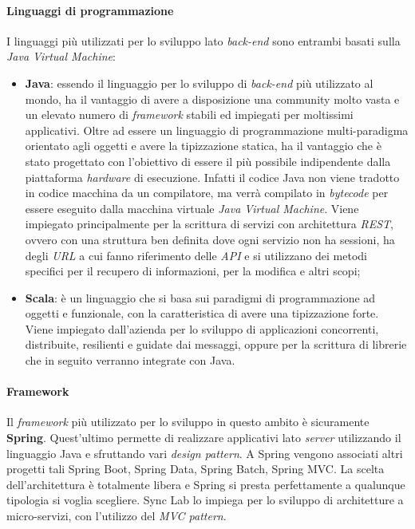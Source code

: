 \paragraph{Linguaggi di programmazione}
I linguaggi più utilizzati per lo sviluppo lato \textit{back-end} sono entrambi basati sulla \textit{Java Virtual Machine}:
\begin{itemize}
  \item \textbf{Java}: essendo il linguaggio per lo sviluppo di \textit{back-end} più utilizzato al mondo, ha il vantaggio di avere a disposizione una community molto vasta e un elevato numero di \textit{framework} stabili ed impiegati per moltissimi applicativi. Oltre ad essere un linguaggio di programmazione multi-paradigma orientato agli oggetti e avere la tipizzazione statica, ha il vantaggio che è stato progettato con l'obiettivo di essere il più possibile indipendente dalla piattaforma \textit{hardware} di esecuzione. Infatti il codice Java non viene tradotto in codice macchina da un compilatore, ma verrà compilato in \textit{bytecode} per essere eseguito dalla macchina virtuale \textit{Java Virtual Machine}. Viene impiegato principalmente per la scrittura di servizi con architettura \textit{REST}, ovvero con una struttura ben definita dove ogni servizio non ha sessioni, ha degli \textit{URL} a cui fanno riferimento delle \textit{API} e si utilizzano dei metodi specifici per il recupero di informazioni, per la modifica e altri scopi;
  
  \item \textbf{Scala}: è un linguaggio che si basa sui paradigmi di programmazione ad oggetti e funzionale, con la caratteristica di avere una tipizzazione forte. Viene impiegato dall'azienda per lo sviluppo di applicazioni concorrenti, distribuite, resilienti e guidate dai messaggi, oppure per la scrittura di librerie che in seguito verranno integrate con Java.
\end{itemize}

\paragraph{Framework} Il \textit{framework} più utilizzato per lo sviluppo in questo ambito è sicuramente \textbf{Spring}. Quest'ultimo permette di realizzare applicativi lato \textit{server} utilizzando il linguaggio Java e sfruttando vari \textit{design pattern}. A Spring vengono associati altri progetti tali Spring Boot, Spring Data, Spring Batch, Spring MVC. La scelta dell'architettura è totalmente libera e Spring si presta perfettamente a qualunque tipologia si voglia scegliere. 
Sync Lab lo impiega per lo sviluppo di architetture a micro-servizi, con l'utilizzo del \textit{MVC pattern}.

